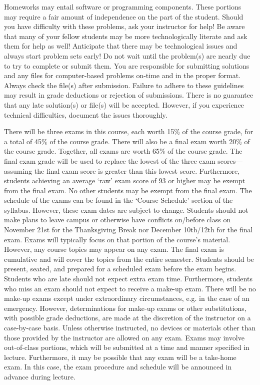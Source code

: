 \documentclass[11pt,letterpaper]{article}
\begin{document}
Homeworks may entail software or programming components. These portions may require a fair amount of independence on the part of the student. Should you have difficulty with these problems, ask your instructor for help! Be aware that many of your fellow students may be more technologically literate and ask them for help as well! Anticipate that there may be technological issues and always start problem sets early! Do not wait until the problem(s) are nearly due to try to complete or submit them. You are responsible for submitting solutions and any files for computer-based problems on-time and in the proper format. Always check the file(s) after submission. Failure to adhere to these guidelines may result in grade deductions or rejection of submissions. There is no guarantee that any late solution(s) or file(s) will be accepted. However, if you experience technical difficulties, document the issues thoroughly. 
\sectionbreak




There will be three exams in this course, each worth 15\% of the course grade, for a total of 45\% of the course grade. There will also be a final exam worth 20\% of the course grade. Together, all exams are worth 65\% of the course grade. The final exam grade will be used to replace the lowest of the three exam scores---assuming the final exam score is greater than this lowest score. Furthermore, students achieving an average `raw' exam score of 93 or higher may be exempt from the final exam. No other students may be exempt from the final exam. The schedule of the exams can be found in the `Course Schedule' section of the syllabus. However, these exam dates are subject to change. Students should not make plans to leave campus or otherwise have conflicts on/before class on November 21st for the Thanksgiving Break nor December 10th/12th for the final exam. Exams will typically focus on that portion of the course's material. However, any course topics may appear on any exam. The final exam is cumulative and will cover the topics from the entire semester. Students should be present, seated, and prepared for a scheduled exam before the exam begins. Students who are late should not expect extra exam time. Furthermore, students who miss an exam should not expect to receive a make-up exam. There will be no make-up exams except under extraordinary circumstances, e.g. in the case of an emergency. However, determinations for make-up exams or other substitutions, with possible grade deductions, are made at the discretion of the instructor on a case-by-case basis. Unless otherwise instructed, no devices or materials other than those provided by the instructor are allowed on any exam. Exams may involve out-of-class portions, which will be submitted at a time and manner specified in lecture. Furthermore, it may be possible that any exam will be a take-home exam. In this case, the exam procedure and schedule will be announced in advance during lecture. 
\sectionbreak
\end{document}
